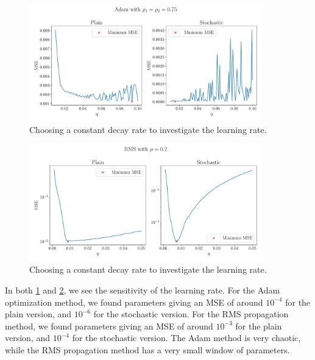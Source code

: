 \onecolumngrid
\begin{figure}[h!]
    \begin{minipage}{\textwidth}
        \centering
        \includegraphics[width = 0.9\textwidth]{../figs/Adam_zoom.pdf}
        \caption{Choosing a constant decay rate to investigate the learning rate.}
        \label{fig: Adam_zoom}
    \end{minipage}
\end{figure}
\begin{figure}[h!]
    \begin{minipage}{\textwidth}
        \centering
        \includegraphics[width = 0.9\textwidth]{../figs/RMS_Prop_zoom.pdf}
        \caption{Choosing a constant decay rate to investigate the learning rate.}
        \label{fig: RMS_Prop_zoom}
    \end{minipage}
\end{figure}
\twocolumngrid

In both \cref{fig: Adam_zoom} and \cref{fig: RMS_Prop_zoom}, we see the sensitivity of the learning rate. For the Adam optimization method, we found parameters giving an MSE of around \(10^{-4}\) for the plain version, and \(10^{-6}\) for the stochastic version. For the RMS propagation method, we found parameters giving an MSE of around \(10^{-3}\) for the plain version, and \(10^{-4}\) for the stochastic version. The Adam method is very chaotic, while the RMS propagation method has a very small window of parameters. 


